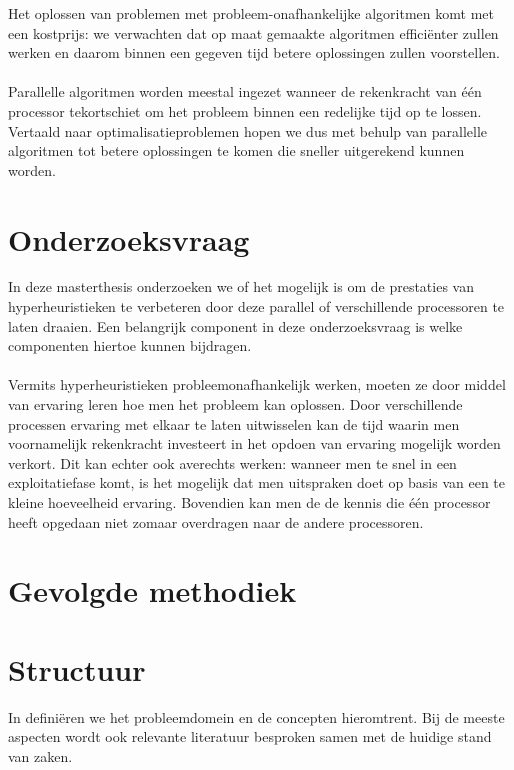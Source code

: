 Het oplossen van problemen met probleem-onafhankelijke algoritmen komt met een kostprijs: we verwachten dat op maat gemaakte algoritmen effici\"enter zullen werken en daarom binnen een gegeven tijd betere oplossingen zullen voorstellen.

\paragraph{}
Parallelle algoritmen worden meestal ingezet wanneer de rekenkracht van \'e\'en processor tekortschiet om het probleem binnen een redelijke tijd op te lossen. Vertaald naar optimalisatieproblemen hopen we dus met behulp van parallelle algoritmen tot betere oplossingen te komen die sneller uitgerekend kunnen worden.

\section{Onderzoeksvraag}

In deze masterthesis onderzoeken we of het mogelijk is om de prestaties van hyperheuristieken te verbeteren door deze parallel of verschillende processoren te laten draaien. Een belangrijk component in deze onderzoeksvraag is welke componenten hiertoe kunnen bijdragen.

\paragraph{}
Vermits hyperheuristieken probleemonafhankelijk werken, moeten ze door middel van ervaring leren hoe men het probleem kan oplossen. Door verschillende processen ervaring met elkaar te laten uitwisselen kan de tijd waarin men voornamelijk rekenkracht investeert in het opdoen van ervaring mogelijk worden verkort. Dit kan echter ook averechts werken: wanneer men te snel in een exploitatiefase komt, is het mogelijk dat men uitspraken doet op basis van een te kleine hoeveelheid ervaring. Bovendien kan men de de kennis die \'e\'en processor heeft opgedaan niet zomaar overdragen naar de andere processoren.

\section{Gevolgde methodiek}


\section{Structuur}
In  defini\"eren we het probleemdomein en de concepten hieromtrent. Bij de meeste aspecten wordt ook relevante literatuur besproken samen met de huidige stand van zaken.

